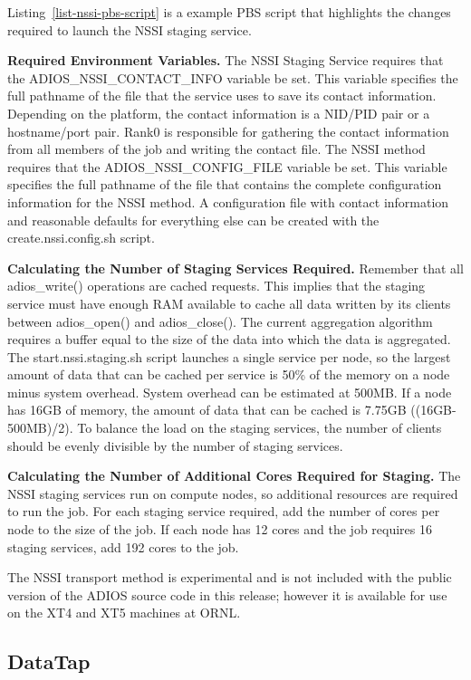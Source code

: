Listing~\ref{list-nssi-pbs-script} is a example PBS script that highlights the changes required to launch 
the NSSI staging service.

\textbf{Required Environment Variables.}  The NSSI Staging Service requires that 
the ADIOS\_NSSI\_CONTACT\_INFO variable be set.  This variable specifies the full 
pathname of the file that the service uses to save its contact information.  Depending 
on the platform, the contact information is a NID/PID pair or a hostname/port pair. 
 Rank0 is responsible for gathering the contact information from all members of 
the job and writing the contact file.  The NSSI method requires that the ADIOS\_NSSI\_CONFIG\_FILE 
variable be set.  This variable specifies the full pathname of the file that contains 
the complete configuration information for the NSSI method.  A configuration file 
with contact information and reasonable defaults for everything else can be created 
with the create.nssi.config.sh script.

\textbf{Calculating the Number of Staging Services Required.}  Remember that all 
adios\_write() operations are cached requests.  This implies that the staging service 
must have enough RAM available to cache all data written by its clients between 
adios\_open() and adios\_close().  The current aggregation algorithm requires a 
buffer equal to the size of the data into which the data is aggregated.  The start.nssi.staging.sh 
script launches a single service per node, so the largest amount of data that can 
be cached per service is 50\% of the memory on a node minus system overhead.  System 
overhead can be estimated at 500MB.  If a node has 16GB of memory, the amount of 
data that can be cached is 7.75GB ((16GB-500MB)/2).  To balance the load on the 
staging services, the number of clients should be evenly divisible by the number 
of staging services.

\textbf{Calculating the Number of Additional Cores Required for Staging.}  The 
NSSI staging services run on compute nodes, so additional resources are required 
to run the job.  For each staging service required, add the number of cores per 
node to the size of the job.  If each node has 12 cores and the job requires 16 
staging services, add 192 cores to the job.

The NSSI transport method is experimental and is not included with the public version 
of the ADIOS source code in this release; however it is available for use on the 
XT4 and XT5 machines at ORNL.

\subsection{DataTap}

